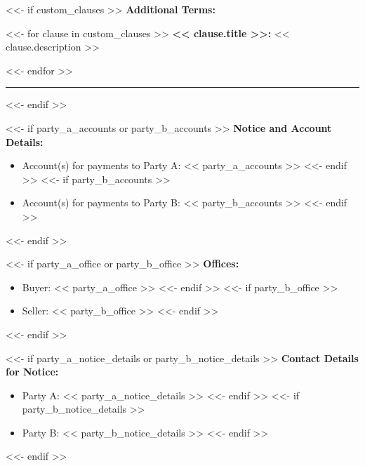 \documentclass[11pt, a4paper]{article}
\begin{document}

<<- if custom_clauses >>
\noindent \textbf{Additional Terms:}
\vspace{0.2cm}

<<- for clause in custom_clauses >>
\noindent \textbf{<< clause.title >>:} << clause.description >>

\vspace{0.2cm}
<<- endfor >>
\vspace{0.3cm}
\hrule
\vspace{0.5cm}
<<- endif >>


<<- if party_a_accounts or party_b_accounts >>
\noindent \textbf{Notice and Account Details:}
\begin{itemize}[leftmargin=2cm, label={}, itemsep=3pt]
<<- if party_a_accounts >>
    \item Account(s) for payments to Party A: << party_a_accounts >>
<<- endif >>
<<- if party_b_accounts >>
    \item Account(s) for payments to Party B: << party_b_accounts >>
<<- endif >>
\end{itemize}
\vspace{0.3cm}
<<- endif >>

<<- if party_a_office or party_b_office >>
\noindent \textbf{Offices:}
\begin{itemize}[leftmargin=2cm, label={}, itemsep=3pt]
<<- if party_a_office >>
    \item Buyer: << party_a_office >>
<<- endif >>
<<- if party_b_office >>
    \item Seller: << party_b_office >>
<<- endif >>
\end{itemize}
\vspace{0.3cm}
<<- endif >>

<<- if party_a_notice_details or party_b_notice_details >>
\noindent \textbf{Contact Details for Notice:}
\begin{itemize}[leftmargin=2cm, label={}, itemsep=3pt]
<<- if party_a_notice_details >>
    \item Party A: << party_a_notice_details >>
<<- endif >>
<<- if party_b_notice_details >>
    \item Party B: << party_b_notice_details >>
<<- endif >>
\end{itemize}
\vspace{0.3cm}
<<- endif >>
\end{document}
